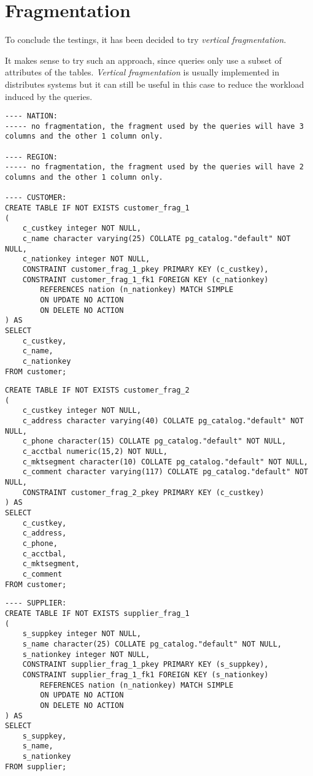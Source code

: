 

\section{Fragmentation}
\label{sec:fragmentation}

To conclude the testings, it has been decided to try \textit{vertical fragmentation}.

It makes sense to try such an approach, since queries only use a subset of attributes of the tables. \textit{Vertical fragmentation} is usually implemented in distributes systems but it can still be useful in this case to reduce the workload induced by the queries.

\begin{lstlisting}
---- NATION: 
----- no fragmentation, the fragment used by the queries will have 3 columns and the other 1 column only.

---- REGION:
----- no fragmentation, the fragment used by the queries will have 2 columns and the other 1 column only.

---- CUSTOMER:
CREATE TABLE IF NOT EXISTS customer_frag_1
(
    c_custkey integer NOT NULL,
    c_name character varying(25) COLLATE pg_catalog."default" NOT NULL,
    c_nationkey integer NOT NULL,
    CONSTRAINT customer_frag_1_pkey PRIMARY KEY (c_custkey),
    CONSTRAINT customer_frag_1_fk1 FOREIGN KEY (c_nationkey)
        REFERENCES nation (n_nationkey) MATCH SIMPLE
        ON UPDATE NO ACTION
        ON DELETE NO ACTION
) AS
SELECT
	c_custkey,
	c_name,
	c_nationkey
FROM customer;
\end{lstlisting}
\begin{lstlisting}
CREATE TABLE IF NOT EXISTS customer_frag_2
(
	c_custkey integer NOT NULL,
    c_address character varying(40) COLLATE pg_catalog."default" NOT NULL,
    c_phone character(15) COLLATE pg_catalog."default" NOT NULL,
    c_acctbal numeric(15,2) NOT NULL,
    c_mktsegment character(10) COLLATE pg_catalog."default" NOT NULL,
    c_comment character varying(117) COLLATE pg_catalog."default" NOT NULL,
    CONSTRAINT customer_frag_2_pkey PRIMARY KEY (c_custkey)
) AS
SELECT
	c_custkey,
	c_address,
	c_phone,
	c_acctbal,
	c_mktsegment,
	c_comment
FROM customer;
\end{lstlisting}
\begin{lstlisting}
---- SUPPLIER:
CREATE TABLE IF NOT EXISTS supplier_frag_1
(
    s_suppkey integer NOT NULL,
    s_name character(25) COLLATE pg_catalog."default" NOT NULL,
    s_nationkey integer NOT NULL,
    CONSTRAINT supplier_frag_1_pkey PRIMARY KEY (s_suppkey),
    CONSTRAINT supplier_frag_1_fk1 FOREIGN KEY (s_nationkey)
        REFERENCES nation (n_nationkey) MATCH SIMPLE
        ON UPDATE NO ACTION
        ON DELETE NO ACTION
) AS
SELECT
	s_suppkey,
	s_name,
	s_nationkey
FROM supplier;
\end{lstlisting}
